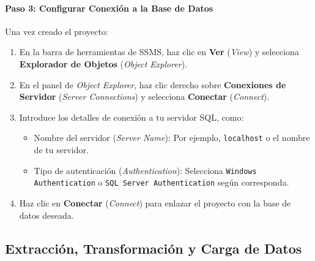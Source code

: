 \documentclass{article}
\begin{document}
	\paragraph{Paso 3: Configurar Conexión a la Base de Datos}  
	Una vez creado el proyecto:
	\begin{enumerate}
		\item En la barra de herramientas de SSMS, haz clic en \textbf{Ver} (\textit{View}) y selecciona \textbf{Explorador de Objetos} (\textit{Object Explorer}).
		\item En el panel de \textit{Object Explorer}, haz clic derecho sobre \textbf{Conexiones de Servidor} (\textit{Server Connections}) y selecciona \textbf{Conectar} (\textit{Connect}).
		\item Introduce los detalles de conexión a tu servidor SQL, como:
		\begin{itemize}
			\item Nombre del servidor (\textit{Server Name}): Por ejemplo, \texttt{localhost} o el nombre de tu servidor.
			\item Tipo de autenticación (\textit{Authentication}): Selecciona \texttt{Windows Authentication} o \texttt{SQL Server Authentication} según corresponda.
		\end{itemize}
		\item Haz clic en \textbf{Conectar} (\textit{Connect}) para enlazar el proyecto con la base de datos deseada.
	\end{enumerate}
	
	
	\subsection{Extracción, Transformación y Carga de Datos}
	
\end{document}
